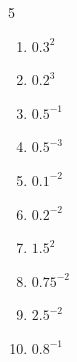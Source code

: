 \documentclass[12pt,a4paper]{article}
\begin{document}
\begin{enumerate}[resume]
\vspace{2pt}
\begin{multicols}{5}
\begin{enumerate}[resume,itemsep=4.2em]
  \item $0.3^2$
  \item $0.2^3$
  \item $0.5^{-1}$
  \item $0.5^{-3}$
  \item $0.1^{-2}$
  \item $0.2^{-2}$
  \item $1.5^2$
  \item $0.75^{-2}$
  \item $2.5^{-2}$
  \item $0.8^{-1}$
\end{enumerate}
\end{multicols}
\vspace{3.5em}

\end{enumerate}

\newpage
\end{document}
